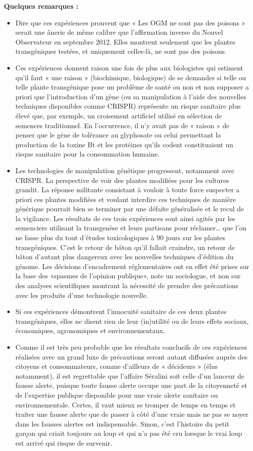 \documentclass[8pt]{article}
\begin{document}
\textbf{Quelques remarques :}
\begin{itemize}
	\item Dire que ces expériences prouvent que « Les OGM ne sont pas des poisons » serait une ânerie de même calibre que l’affirmation inverse du Nouvel Observateur en septembre 2012. Elles montrent seulement que les plantes transgéniques testées, et uniquement celles-là, ne sont pas des poisons.
	\item Ces expériences donnent raison une fois de plus aux biologistes qui estiment qu’il faut « une raison » (biochimique, biologique) de se demander si telle ou telle plante transgénique pose un problème de santé ou non et non supposer a priori que l’introduction d’un gène (ou sa manipulation à l’aide des nouvelles techniques disponibles comme CRISPR) représente un risque sanitaire plus élevé que, par exemple, un croisement artificiel utilisé en sélection de semences traditionnel. En l’occurrence, il n’y avait pas de « raison » de penser que le gène de tolérance au glyphosate ou celui permettant la production de la toxine Bt et les protéines qu’ils codent constituaient un risque sanitaire pour la consommation humaine.
	\item Les technologies de manipulation génétique progressent, notamment avec CRISPR. La perspective de voir des plantes modifiées pour les cultures grandit. La réponse militante consistant à vouloir à toute force suspecter a priori ces plantes modifiées et voulant interdire ces techniques de manière générique pourrait bien se terminer par une défaite généralisée et le recul de la vigilance. Les résultats de ces trois expériences sont ainsi agités par les semenciers utilisant la transgenèse et leurs partisans pour réclamer… que l’on ne fasse plus du tout d’études toxicologiques à 90 jours sur les plantes transgéniques. C’est le retour de bâton qu’il fallait craindre, un retour de bâton d’autant plus dangereux avec les nouvelles techniques d’édition du génome. Les décisions d’encadrement réglementaires ont en effet été prises sur la base des «spasmes de l’opinion publique», note un sociologue, et non sur des analyses scientifiques montrant la nécessité de prendre des précautions avec les produits d’une technologie nouvelle.
	\item Si ces expériences démontrent l’innocuité sanitaire de ces deux plantes transgéniques, elles ne disent rien de leur (in)utilité ou de leurs effets sociaux, économiques, agronomiques et environnementaux.
	\item Comme il est très peu probable que les résultats conclusifs de ces expériences réalisées avec un grand luxe de précautions seront autant diffusées auprès des citoyens et consommateurs, comme d’ailleurs de « décideurs » (élus notamment), il est regrettable que l’affaire Séralini soit celle d’un lanceur de fausse alerte, puisque toute fausse alerte occupe une part de la citoyenneté et de l’expertise publique disponible pour une vraie alerte sanitaire ou environnementale. Certes, il vaut mieux se tromper de temps en temps et traiter une fausse alerte que de passer à côté d’une vraie mais ne pas se noyer dans les fausses alertes est indispensable. Sinon, c’est l’histoire du petit garçon qui criait toujours au loup et qui n’a pas été cru lorsque le vrai loup est arrivé qui risque de survenir.

\end{itemize}
\end{document}
